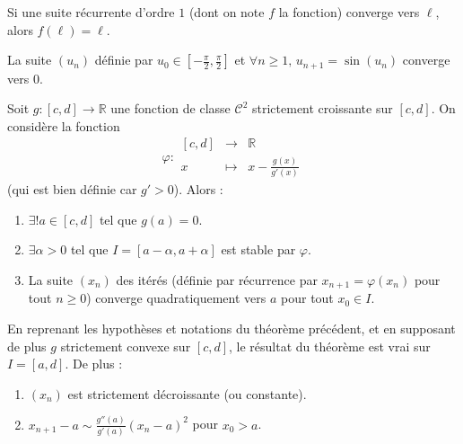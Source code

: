   \begin{corollary}
    Si une suite récurrente d'ordre $1$ (dont on note $f$ la fonction) converge vers $\ell$, alors $f(\ell) = \ell$.
  \end{corollary}

  \begin{example}
    La suite $(u_n)$ définie par $u_0 \in \left[ -\frac{\pi}{2}, \frac{\pi}{2} \right]$ et $\forall n \geq 1, \, u_{n+1} = \sin(u_n)$ converge vers $0$.
  \end{example}


  \begin{application}
    Soit $g : [c, d] \rightarrow \mathbb{R}$ une fonction de classe $\mathcal{C}^2$ strictement croissante sur $[c, d]$. On considère la fonction
    \[ \varphi :
    \begin{array}{ccc}
      [c, d] &\rightarrow& \mathbb{R} \\
      x &\mapsto& x - \frac{g(x)}{g'(x)}
    \end{array}
    \]
    (qui est bien définie car $g' > 0$). Alors :
    \begin{enumerate}[label=(\roman*)]
      \item $\exists! a \in [c, d]$ tel que $g(a) = 0$.
      \item $\exists \alpha > 0$ tel que $I = [a - \alpha, a + \alpha]$ est stable par $\varphi$.
      \item La suite $(x_n)$ des itérés (définie par récurrence par $x_{n+1} = \varphi(x_n)$ pour tout $n \geq 0$) converge quadratiquement vers $a$ pour tout $x_0 \in I$.
    \end{enumerate}
  \end{application}

  \begin{corollary}
    En reprenant les hypothèses et notations du théorème précédent, et en supposant de plus $g$ strictement convexe sur $[c, d]$, le résultat du théorème est vrai sur $I = [a, d]$. De plus :
    \begin{enumerate}[label=(\roman*)]
      \item $(x_n)$ est strictement décroissante (ou constante).
      \item $x_{n+1} - a \sim \frac{g''(a)}{g'(a)} (x_n - a)^2$ pour $x_0 > a$.
    \end{enumerate}
  \end{corollary}

